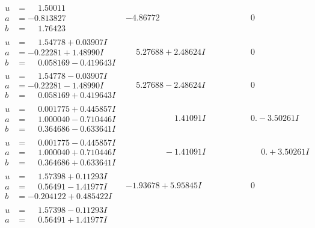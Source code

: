 \documentclass[1p]{elsarticle_modified}
\theoremstyle{definition}
\begin{document}
$$\begin{array}{c|c|c}
\begin{aligned}
u &= \phantom{-}1.50011\phantom{ +0.000000I} \\
a &= -0.813827\phantom{ +0.000000I} \\
b &= \phantom{-}1.76423\phantom{ +0.000000I}\end{aligned}
 & -4.86772\phantom{ +0.000000I} & \phantom{-0.000000 } 0 \\ \hline\begin{aligned}
u &= \phantom{-}1.54778 + 0.03907 I \\
a &= -0.22281 + 1.48990 I \\
b &= \phantom{-}0.058169 - 0.419643 I\end{aligned}
 & \phantom{-}5.27688 + 2.48624 I & \phantom{-0.000000 } 0 \\ \hline\begin{aligned}
u &= \phantom{-}1.54778 - 0.03907 I \\
a &= -0.22281 - 1.48990 I \\
b &= \phantom{-}0.058169 + 0.419643 I\end{aligned}
 & \phantom{-}5.27688 - 2.48624 I & \phantom{-0.000000 } 0 \\ \hline\begin{aligned}
u &= \phantom{-}0.001775 + 0.445857 I \\
a &= \phantom{-}1.000040 - 0.710446 I \\
b &= \phantom{-}0.364686 - 0.633641 I\end{aligned}
 & \phantom{-0.000000 -}1.41091 I & \phantom{-0.000000 } 0. - 3.50261 I \\ \hline\begin{aligned}
u &= \phantom{-}0.001775 - 0.445857 I \\
a &= \phantom{-}1.000040 + 0.710446 I \\
b &= \phantom{-}0.364686 + 0.633641 I\end{aligned}
 & \phantom{-0.000000 } -1.41091 I & \phantom{-0.000000 -}0. + 3.50261 I \\ \hline\begin{aligned}
u &= \phantom{-}1.57398 + 0.11293 I \\
a &= \phantom{-}0.56491 - 1.41977 I \\
b &= -0.204122 + 0.485422 I\end{aligned}
 & -1.93678 + 5.95845 I & \phantom{-0.000000 } 0 \\ \hline\begin{aligned}
u &= \phantom{-}1.57398 - 0.11293 I \\
a &= \phantom{-}0.56491 + 1.41977 I \\

\end{aligned}
\end{array}$$
\end{document}
